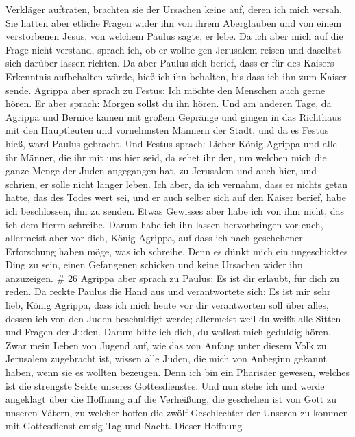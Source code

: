 Verkläger auftraten, brachten sie der Ursachen keine auf, deren ich mich
versah.  Sie hatten aber etliche Fragen wider ihn von ihrem
Aberglauben und von einem verstorbenen Jesus, von welchem Paulus sagte,
er lebe.  Da ich aber mich auf die Frage nicht verstand,
sprach ich, ob er wollte gen Jerusalem reisen und daselbst sich darüber
lassen richten.  Da aber Paulus sich berief, dass er für
des Kaisers Erkenntnis aufbehalten würde, hieß ich ihn behalten, bis
dass ich ihn zum Kaiser sende.  Agrippa aber sprach zu
Festus: Ich möchte den Menschen auch gerne hören. Er aber sprach: Morgen
sollst du ihn hören.  Und am anderen Tage, da Agrippa und
Bernice kamen mit großem Gepränge und gingen in das Richthaus mit den
Hauptleuten und vornehmsten Männern der Stadt, und da es Festus hieß,
ward Paulus gebracht.  Und Festus sprach: Lieber König
Agrippa und alle ihr Männer, die ihr mit uns hier seid, da sehet ihr
den, um welchen mich die ganze Menge der Juden angegangen hat, zu
Jerusalem und auch hier, und schrien, er solle nicht länger leben.
 Ich aber, da ich vernahm, dass er nichts getan hatte, das
des Todes wert sei, und er auch selber sich auf den Kaiser berief, habe
ich beschlossen, ihn zu senden.  Etwas Gewisses aber habe
ich von ihm nicht, das ich dem Herrn schreibe. Darum habe ich ihn lassen
hervorbringen vor euch, allermeist aber vor dich, König Agrippa, auf
dass ich nach geschehener Erforschung haben möge, was ich schreibe.
 Denn es dünkt mich ein ungeschicktes Ding zu sein, einen
Gefangenen schicken und keine Ursachen wider ihn anzuzeigen. \# 26
 Agrippa aber sprach zu Paulus: Es ist dir erlaubt, für dich
zu reden. Da reckte Paulus die Hand aus und verantwortete sich:
 Es ist mir sehr lieb, König Agrippa, dass ich mich heute
vor dir verantworten soll über alles, dessen ich von den Juden
beschuldigt werde;  allermeist weil du weißt alle Sitten und
Fragen der Juden. Darum bitte ich dich, du wollest mich geduldig hören.
 Zwar mein Leben von Jugend auf, wie das von Anfang unter
diesem Volk zu Jerusalem zugebracht ist, wissen alle Juden, 
die mich von Anbeginn gekannt haben, wenn sie es wollten bezeugen. Denn
ich bin ein Pharisäer gewesen, welches ist die strengste Sekte unseres
Gottesdienstes.  Und nun stehe ich und werde angeklagt über
die Hoffnung auf die Verheißung, die geschehen ist von Gott zu unseren
Vätern,  zu welcher hoffen die zwölf Geschlechter der
Unseren zu kommen mit Gottesdienst emsig Tag und Nacht. Dieser Hoffnung
